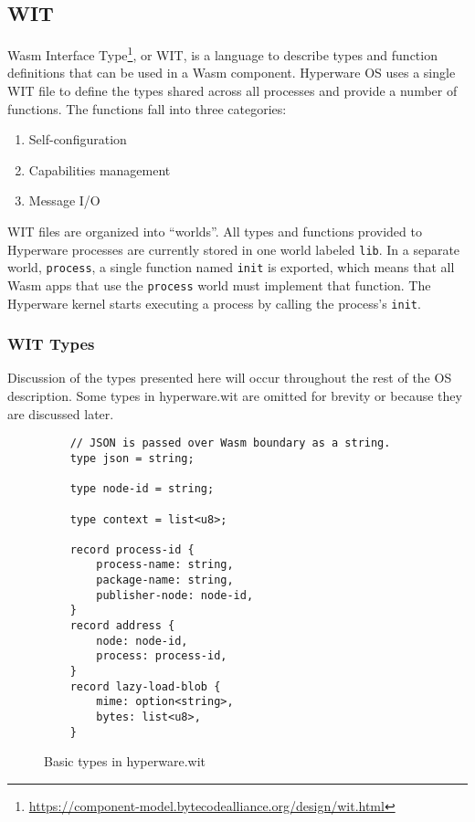 \documentclass[runningheads]{llncs}
\begin{document}
\subsection{WIT}
\label{sec:oswit}

Wasm Interface Type\footnote{\url{https://component-model.bytecodealliance.org/design/wit.html}}, or WIT, is a language to describe types and function definitions that can be used in a Wasm component.
Hyperware OS uses a single WIT file to define the types shared across all processes and provide a number of functions.
The functions fall into three categories:
\begin{enumerate}
    \item Self-configuration
    \item Capabilities management
    \item Message I/O
\end{enumerate}

WIT files are organized into ``worlds''.
All types and functions provided to Hyperware processes are currently stored in one world labeled \verb|lib|.
In a separate world, \verb|process|, a single function named \verb|init| is exported, which means that all Wasm apps that use the \verb|process| world must implement that function.
The Hyperware kernel starts executing a process by calling the process's \verb|init|.

\subsubsection{WIT Types}
\label{sec:oswittypes}

Discussion of the types presented here will occur throughout the rest of the OS description.
Some types in hyperware.wit are omitted for brevity or because they are discussed later.

\begin{figure}[H]
    \centering
    \begin{verbatim}
    // JSON is passed over Wasm boundary as a string.
    type json = string;

    type node-id = string;

    type context = list<u8>;

    record process-id {
        process-name: string,
        package-name: string,
        publisher-node: node-id,
    }
    record address {
        node: node-id,
        process: process-id,
    }
    record lazy-load-blob {
        mime: option<string>,
        bytes: list<u8>,
    }
    \end{verbatim}
    \caption{Basic types in hyperware.wit}
    \label{fig:WIT Types 1}
\end{figure}
\end{document}
